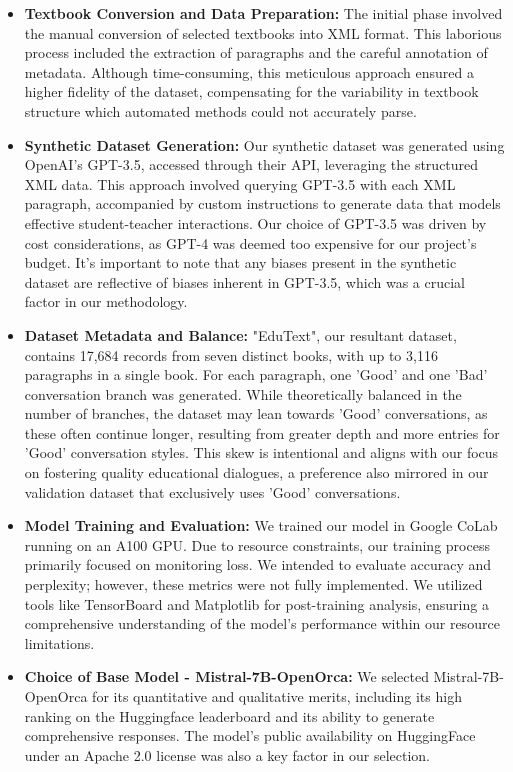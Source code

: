 \documentclass[]{article}
\begin{document}
\begin{itemize}
    \item \textbf{Textbook Conversion and Data Preparation:} The initial phase involved the manual conversion of selected textbooks into XML format. This laborious process included the extraction of paragraphs and the careful annotation of metadata. Although time-consuming, this meticulous approach ensured a higher fidelity of the dataset, compensating for the variability in textbook structure which automated methods could not accurately parse.

    \item \textbf{Synthetic Dataset Generation:} Our synthetic dataset was generated using OpenAI's GPT-3.5, accessed through their API, leveraging the structured XML data. This approach involved querying GPT-3.5 with each XML paragraph, accompanied by custom instructions to generate data that models effective student-teacher interactions. Our choice of GPT-3.5 was driven by cost considerations, as GPT-4 was deemed too expensive for our project's budget. It's important to note that any biases present in the synthetic dataset are reflective of biases inherent in GPT-3.5, which was a crucial factor in our methodology.

    \item \textbf{Dataset Metadata and Balance:} "EduText", our resultant dataset, contains 17,684 records from seven distinct books, with up to 3,116 paragraphs in a single book. For each paragraph, one 'Good' and one 'Bad' conversation branch was generated. While theoretically balanced in the number of branches, the dataset may lean towards 'Good' conversations, as these often continue longer, resulting from greater depth and more entries for 'Good' conversation styles. This skew is intentional and aligns with our focus on fostering quality educational dialogues, a preference also mirrored in our validation dataset that exclusively uses 'Good' conversations.

    \item \textbf{Model Training and Evaluation:} We trained our model in Google CoLab running on an A100 GPU. Due to resource constraints, our training process primarily focused on monitoring loss. We intended to evaluate accuracy and perplexity; however, these metrics were not fully implemented. We utilized tools like TensorBoard and Matplotlib for post-training analysis, ensuring a comprehensive understanding of the model's performance within our resource limitations.

    \item \textbf{Choice of Base Model - Mistral-7B-OpenOrca:} We selected Mistral-7B-OpenOrca for its quantitative and qualitative merits, including its high ranking on the Huggingface leaderboard and its ability to generate comprehensive responses. The model's public availability on HuggingFace under an Apache 2.0 license was also a key factor in our selection.


\end{itemize}
\end{document}
